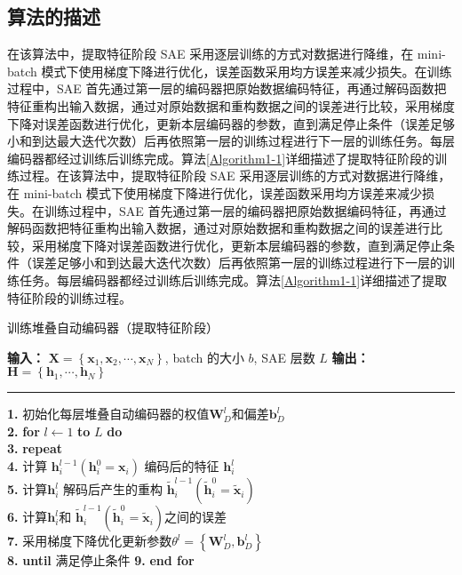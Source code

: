 \subsection{算法的描述}
在该算法中，提取特征阶段 SAE 采用逐层训练的方式对数据进行降维，在 mini-batch 模式下使用梯度下降进行优化，误差函数采用均方误差来减少损失。在训练过程中，SAE 首先通过第一层的编码器把原始数据编码特征，再通过解码函数把特征重构出输入数据，通过对原始数据和重构数据之间的误差进行比较，采用梯度下降对误差函数进行优化，更新本层编码器的参数，直到满足停止条件（误差足够小和到达最大迭代次数）后再依照第一层的训练过程进行下一层的训练任务。每层编码器都经过训练后训练完成。算法\ref{Algorithm1-1}详细描述了提取特征阶段的训练过程。在该算法中，提取特征阶段 SAE 采用逐层训练的方式对数据进行降维，在 mini-batch 模式下使用梯度下降进行优化，误差函数采用均方误差来减少损失。在训练过程中，SAE 首先通过第一层的编码器把原始数据编码特征，再通过解码函数把特征重构出输入数据，通过对原始数据和重构数据之间的误差进行比较，采用梯度下降对误差函数进行优化，更新本层编码器的参数，直到满足停止条件（误差足够小和到达最大迭代次数）后再依照第一层的训练过程进行下一层的训练任务。每层编码器都经过训练后训练完成。算法\ref{Algorithm1-1}详细描述了提取特征阶段的训练过程。
\vspace{10pt}
\begin{algorithm}[htb]
	\caption{训练堆叠自动编码器（提取特征阶段）}\label{Algorithm1-1}
	\begin{algorithmic}
		\wuhao
		\STATE \textbf{输入：}
		$\boldsymbol{X}=\left\{\boldsymbol{x}_1, \boldsymbol{x}_2, \cdots, \boldsymbol{x}_N\right\}$, batch 的大小 $b$, SAE 层数 $L$
		\STATE \textbf{输出：}
		$\boldsymbol{H}=\left\{\boldsymbol{h}_1, \cdots, \boldsymbol{h}_N\right\}$ \\
		\vspace{0.3em}
		\hrule
		\vspace{0.3em}
		\STATE \textbf{1. }
		初始化每层堆叠自动编码器的权值$\boldsymbol{W}_D^l$和偏差$\boldsymbol{b}_D^l$\\
		\STATE \textbf{2. }
		\textbf { for } $l \leftarrow 1$ \textbf { to } $L$ \textbf { do } \\
		\STATE \textbf{3. }
		\textbf { repeat} \\
		\STATE \textbf{4. }
		计算 $\boldsymbol{h}_i^{l-1}\left(\boldsymbol{h}_i^0=\boldsymbol{x}_i\right)$ 编码后的特征 $\boldsymbol{h}_i^l$ \\
		\STATE \textbf{5. }
		计算$\boldsymbol{h}_i^l$ 解码后产生的重构 $\tilde{\boldsymbol{h}}_i^{l-1}\left(\tilde{\boldsymbol{h}}_i^0=\tilde{\boldsymbol{x}}_i\right)$ \\
		\STATE \textbf{6. }
		计算$\boldsymbol{h}_i^l$和 $\tilde{\boldsymbol{h}}_i^{l-1}\left(\tilde{\boldsymbol{h}}_i^0=\tilde{\boldsymbol{x}}_i\right)$之间的误差  \\
		\STATE \textbf{7. }
		采用梯度下降优化更新参数$\theta^l=\left\{\boldsymbol{W}_D^l, \boldsymbol{b}_D^l\right\}$ \\
		\STATE \textbf{8. }
		\textbf {until} 满足停止条件
		\STATE \textbf{9. }
		\textbf {end for}
	\end{algorithmic}
\end{algorithm}



